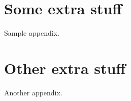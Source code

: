 \documentclass[ieee]{qutad} %
\begin{document}
{
  \cleardoublepage
  \ifdefined{}
  \else
  \fi
}

\printbibliography[title = {REFERENCES}]

\begin{appendices}

  \chapter{Some extra stuff} \label{app1}
  Sample appendix.
  \lipsum
  
  \chapter{Other extra stuff} \label{app2}
  Another appendix.
  \lipsum

\end{appendices}
\end{document}
